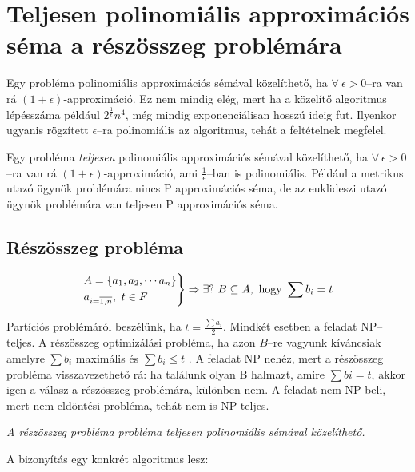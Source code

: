 \section{Teljesen polinomiális approximációs séma a részösszeg problémára}

Egy probléma polinomiális approximációs sémával közelíthető, ha
$\forall~\epsilon>0$--ra van rá $(1+\epsilon)$-approximáció. Ez nem mindig elég,
mert ha a közelítő algoritmus lépésszáma például $2^{\frac{1}{\epsilon}}n^4$,
még mindig exponenciálisan hosszú ideig fut. Ilyenkor ugyanis rögzített
$\epsilon$--ra polinomiális az algoritmus, tehát a feltételnek megfelel.

Egy probléma \emph{teljesen} polinomiális approximációs sémával közelíthető, ha
$\forall~\epsilon>0$--ra van rá $(1+\epsilon)$-approximáció, ami
$\frac{1}{\epsilon}$--ban is polinomiális. Például a metrikus utazó ügynök
problémára nincs P approximációs séma, de az euklideszi utazó ügynök problémára
van teljesen P approximációs séma.

\subsection{Részösszeg probléma}

\[
	\begin{rcases}
		A=\{a_1, a_2, \cdots a_n\} \\
		a_{i=\overline{1,n}},~t \in F
	\end{rcases} \Rightarrow \exists ?~B \subseteq A,  \mbox{ hogy } \sum b_i =t
\]

Partíciós problémáról beszélünk, ha $t = \frac{\sum a_i}{2}$. Mindkét esetben a
feladat NP--teljes. A részösszeg optimizálási probléma, ha azon $B$--re
vagyunk kíváncsiak amelyre $\sum b_i$ maximális és $\sum b_i \leq t$ . A feladat
NP nehéz, mert a részösszeg probléma visszavezethető rá: ha találunk olyan B
halmazt, amire $\sum bi = t$, akkor igen a válasz a részösszeg problémára,
különben nem. A feladat nem NP-beli, mert nem eldöntési probléma, tehát nem is
NP-teljes.

\vspace{0.4cm}
\emph{A részösszeg probléma probléma teljesen polinomiális sémával közelíthető.}
\vspace{0.4cm}

A bizonyítás egy konkrét algoritmus lesz:

